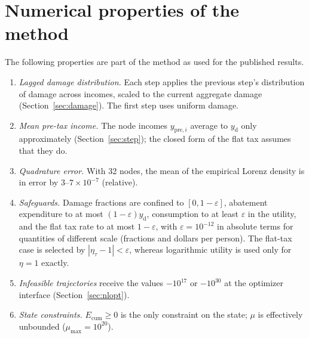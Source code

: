 \documentclass[11pt]{article}
\newcommand{\etat}{\eta_{\tau}}
\newcommand{\yd}{y_{\mathrm{d}}}
\newcommand{\Ecum}{E_{\mathrm{cum}}}
\begin{document}
\section{Numerical properties of the method}
\label{sec:caveats}

The following properties are part of the method as used for the published
results.
\begin{enumerate}
  \item \emph{Lagged damage distribution.} Each step applies the previous
  step's distribution of damage across incomes, scaled to the current
  aggregate damage (Section~\ref{sec:damage}). The first step uses uniform
  damage.
  \item \emph{Mean pre-tax income.} The node incomes $y_{\mathrm{pre},i}$
  average to $\yd$ only approximately (Section~\ref{sec:step}); the closed form
  of the flat tax assumes that they do.
  \item \emph{Quadrature error.} With 32 nodes, the mean of the empirical
  Lorenz density is in error by $3$--$7\times10^{-7}$ (relative).
  \item \emph{Safeguards.} Damage fractions are confined to
  $[0, 1-\varepsilon]$, abatement expenditure to at most $(1-\varepsilon)\yd$,
  consumption to at least $\varepsilon$ in the utility, and the flat tax rate
  to at most $1-\varepsilon$, with $\varepsilon = 10^{-12}$ in absolute terms
  for quantities of different scale (fractions and dollars per person). The
  flat-tax case is selected by $|\etat - 1|<\varepsilon$, whereas logarithmic
  utility is used only for $\eta = 1$ exactly.
  \item \emph{Infeasible trajectories} receive the values $-10^{17}$ or
  $-10^{30}$ at the optimizer interface (Section~\ref{sec:nlopt}).
  \item \emph{State constraints.} $\Ecum\ge0$ is the only constraint on the
  state; $\mu$ is effectively unbounded ($\mu_{\max} = 10^{20}$).
\end{enumerate}
\end{document}

